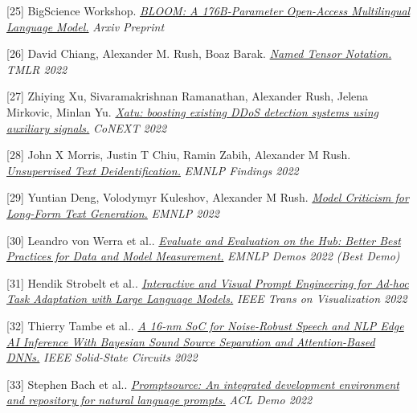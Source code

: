 \documentclass[10pt]{article}
\begin{document}
\medskip


[25] \ind BigScience Workshop. \emph{\href{ https://arxiv.org/abs/2211.05100 }{ BLOOM: A 176B-Parameter Open-Access Multilingual Language Model.} }\emph{ Arxiv Preprint }

\medskip


[26] \ind David Chiang, Alexander M. Rush, Boaz Barak. \emph{\href{ https://arxiv.org/pdf/2102.13196.pdf }{ Named Tensor Notation.} }\emph{ TMLR 2022 }

\medskip


[27] \ind Zhiying Xu, Sivaramakrishnan Ramanathan, Alexander Rush, Jelena Mirkovic, Minlan Yu. \emph{\href{ https://dl.acm.org/doi/abs/10.1145/3555050.3569121 }{ Xatu: boosting existing DDoS detection systems using auxiliary signals.} }\emph{ CoNEXT 2022 }

\medskip


[28] \ind John X Morris, Justin T Chiu, Ramin Zabih, Alexander M Rush. \emph{\href{ https://arxiv.org/pdf/2210.11528.pdf }{ Unsupervised Text Deidentification.} }\emph{ EMNLP Findings 2022 }

\medskip


[29] \ind Yuntian Deng, Volodymyr Kuleshov, Alexander M Rush. \emph{\href{ https://arxiv.org/pdf/2210.08444.pdf }{ Model Criticism for Long-Form Text Generation.} }\emph{ EMNLP 2022 }

\medskip


[30] \ind Leandro von Werra et al.. \emph{\href{ https://arxiv.org/abs/2210.01970 }{ Evaluate and Evaluation on the Hub: Better Best Practices for Data and Model Measurement.} }\emph{ EMNLP Demos 2022 (Best Demo) }

\medskip


[31] \ind Hendik Strobelt et al.. \emph{\href{ https://ieeexplore.ieee.org/abstract/document/9908590 }{ Interactive and Visual Prompt Engineering for Ad-hoc Task Adaptation with Large Language Models.} }\emph{ IEEE Trans on Visualization 2022 }

\medskip


[32] \ind Thierry Tambe et al.. \emph{\href{ https://discovery.ucl.ac.uk/id/eprint/10150658/1/A_16-nm_SoC_for_Noise-Robust_Speech.pdf }{ A 16-nm SoC for Noise-Robust Speech and NLP Edge AI Inference With Bayesian Sound Source Separation and Attention-Based DNNs.} }\emph{ IEEE Solid-State Circuits 2022 }

\medskip


[33] \ind Stephen Bach et al.. \emph{\href{ https://arxiv.org/abs/2202.01279 }{ Promptsource: An integrated development environment and repository for natural language prompts.} }\emph{ ACL Demo 2022 }
\end{document}
